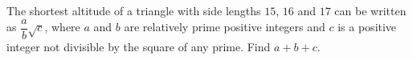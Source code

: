 The shortest altitude of a triangle with side lengths $15$, $16$ and $17$ can be written as $\dfrac {a}{b}\sqrt c$, where $a$ and $b$ are relatively prime positive integers and $c$ is a positive integer not divisible by the square of any prime. Find $a+b+c$.
